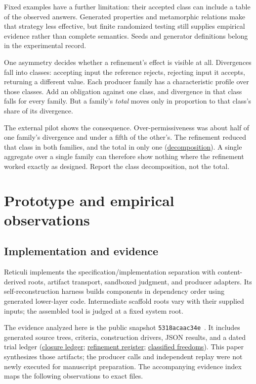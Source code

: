 \documentclass[10pt,twocolumn,letterpaper]{article}
\newcommand{\artifact}[2]{\href{https://github.com/rz4/reticuli/blob/5318acaac34ef99eeba9ff064a995a6313cc70ec/#1}{#2}}
\begin{document}
Fixed examples have a further limitation: their accepted class can include a table of the observed answers. Generated properties and metamorphic relations make that strategy less effective, but finite randomized testing still supplies empirical evidence rather than complete semantics. Seeds and generator definitions belong in the experimental record.

One asymmetry decides whether a refinement's effect is visible at all. Divergences fall into classes: accepting input the reference rejects, rejecting input it accepts, returning a different value. Each producer family has a characteristic profile over those classes. Add an obligation against one class, and divergence in that class falls for every family. But a family's \emph{total} moves only in proportion to that class's share of its divergence.

The external pilot shows the consequence. Over-permissiveness was about half of one family's divergence and under a fifth of the other's. The refinement reduced that class in both families, and the total in only one (\artifact{research/external/jq/cross-family-finding.md}{decomposition}). A single aggregate over a single family can therefore show nothing where the refinement worked exactly as designed. Report the class decomposition, not the total.

\section{Prototype and empirical observations}
\label{sec:empirical}
\subsection{Implementation and evidence}
Reticuli implements the specification/implementation separation with content-derived roots, artifact transport, sandboxed judgment, and producer adapters. Its self-reconstruction harness builds components in dependency order using generated lower-layer code. Intermediate scaffold roots vary with their supplied inputs; the assembled tool is judged at a fixed system root.

The evidence analyzed here is the public snapshot \texttt{5318acaac34e}~\cite{repo}. It includes generated source trees, criteria, construction drivers, JSON results, and a dated trial ledger (\artifact{research/metrics/closure-ledger.md}{closure ledger}; \artifact{research/metrics/genome-map.md}{refinement register}; \artifact{research/metrics/freedom-register.md}{classified freedoms}). This paper synthesizes those artifacts; the producer calls and independent replay were not newly executed for manuscript preparation. The accompanying evidence index maps the following observations to exact files.
\end{document}
